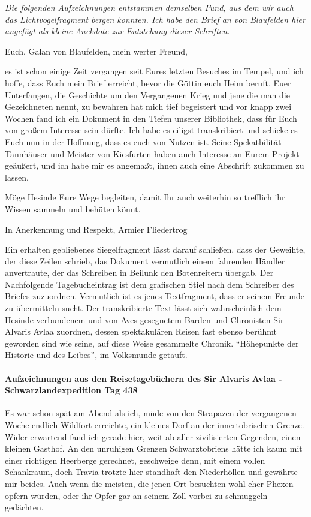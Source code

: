 {\itshape Die folgenden Aufzeichnungen entstammen demselben Fund, aus dem wir auch das Lichtvogelfragment bergen konnten. Ich habe den Brief an von Blaufelden hier angefügt als kleine Anekdote zur Entstehung dieser Schriften.

Euch, Galan von Blaufelden, mein werter Freund,

es ist schon einige Zeit vergangen seit Eures letzten Besuches im Tempel, und ich hoffe, dass Euch mein Brief erreicht, bevor die Göttin euch Heim beruft. Euer Unterfangen, die Geschichte um den Vergangenen Krieg und jene die man die Gezeichneten nennt, zu bewahren hat mich tief begeistert und vor knapp zwei Wochen fand ich ein Dokument in den Tiefen unserer Bibliothek, dass für Euch von großem Interesse sein dürfte. Ich habe es eiligst transkribiert und schicke es Euch nun in der Hoffnung, dass es euch von Nutzen ist. Seine Spekatbilität Tannhäuser und Meister von Kiesfurten haben auch Interesse an Eurem Projekt geäußert, und ich habe mir es angemaßt, ihnen auch eine Abschrift zukommen zu lassen.

Möge Hesinde Eure Wege begleiten, damit Ihr auch weiterhin so trefflich ihr Wissen sammeln und behüten könnt.

In Anerkennung und Respekt,
Armier Fliedertrog}

Ein erhalten gebliebenes Siegelfragment lässt darauf schließen, dass der Geweihte, der diese Zeilen schrieb, das Dokument vermutlich einem fahrenden Händler anvertraute, der das Schreiben in Beilunk den Botenreitern übergab.
Der Nachfolgende Tagebucheintrag ist dem grafischen Stiel nach dem Schreiber des Briefes zuzuordnen. Vermutlich ist es jenes Textfragment, dass er seinem Freunde zu übermitteln sucht. Der transkribierte Text lässt sich wahrscheinlich dem Hesinde verbundenem und von Aves gesegnetem Barden und Chronisten Sir Alvaris Avlaa zuordnen, dessen spektakulären Reisen fast ebenso berühmt geworden sind wie seine, auf diese Weise gesammelte Chronik. ``Höhepunkte der Historie und des Leibes'', im Volksmunde getauft.

\paragraph{Aufzeichnungen aus den Reisetagebüchern des Sir Alvaris Avlaa - Schwarzlandexpedition Tag 438}
Es war schon spät am Abend als ich, müde von den Strapazen der vergangenen Woche endlich Wildfort erreichte, ein kleines Dorf an der innertobrischen Grenze. Wider erwartend fand ich gerade hier, weit ab aller zivilisierten Gegenden, einen kleinen Gasthof. An den unruhigen Grenzen Schwarztobriens hätte ich kaum mit einer richtigen Heerberge gerechnet, geschweige denn, mit einem vollen Schankraum, doch Travia trotzte hier standhaft den Niederhöllen und gewährte mir beides. Auch wenn die meisten, die jenen Ort besuchten wohl eher Phexen opfern würden, oder ihr Opfer gar an seinem Zoll vorbei zu schmuggeln gedächten.


